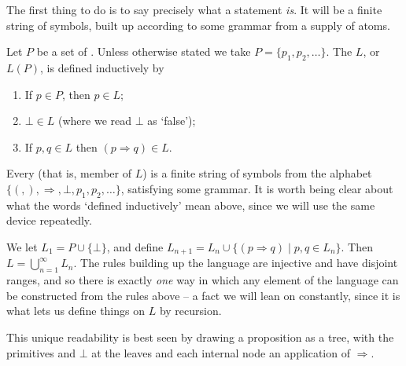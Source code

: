 The first thing to do is to say precisely what a statement \emph{is}. It will be a finite string of symbols, built up according to some grammar from a supply of atoms.

\begin{definition}[Language]
  Let $P$ be a set of . Unless otherwise stated we take $P = \{p_1, p_2, \dots\}$. The  $L$, or $L(P)$, is defined inductively by
  \begin{enumerate}[label=(\roman*)]
    \item If $p \in P$, then $p \in L$;
    \item $\bot \in L$ (where we read $\bot$ as `false');
    \item If $p, q \in L$ then $(p \Rightarrow q) \in L$.
  \end{enumerate}
\end{definition}

Every  (that is, member of $L$) is a finite string of symbols from the alphabet $\{(, ), \Rightarrow, \bot, p_1, p_2, \dots\}$, satisfying some grammar. It is worth being clear about what the words `defined inductively' mean above, since we will use the same device repeatedly.

We let $L_1 = P \cup \{\bot\}$, and define $L_{n + 1} = L_n \cup \{(p \Rightarrow q) \mid p, q \in L_n\}$. Then $L = \bigcup_{n = 1}^{\infty} L_n$. The rules building up the language are injective and have disjoint ranges, and so there is exactly \emph{one} way in which any element of the language can be constructed from the rules above -- a fact we will lean on constantly, since it is what lets us define things on $L$ by recursion.

This unique readability is best seen by drawing a proposition as a tree, with the primitives and $\bot$ at the leaves and each internal node an application of $\Rightarrow$.

\begin{center}
\end{center}

